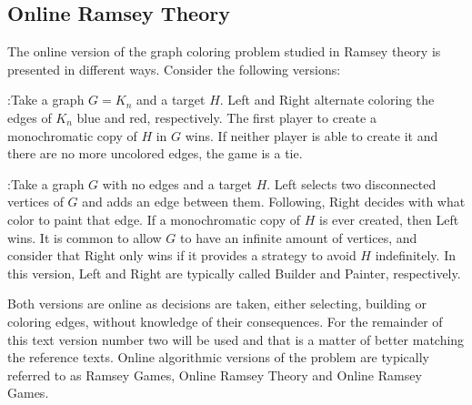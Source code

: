 \subsection*{Online Ramsey Theory}

The online version of the graph coloring problem studied in Ramsey theory is presented in different ways. Consider the following versions:

\begin{version}{1}
:Take a graph $G = K_n$ and a target $H$. Left and Right alternate coloring the edges of $K_n$ blue and red, respectively. The first player to create a monochromatic copy of $H$ in $G$ wins. If neither player is able to create it and there are no more uncolored edges, the game is a tie.
\end{version}

\begin{version}{2}
:Take a graph $G$ with no edges and a target $H$. Left selects two disconnected vertices of $G$ and adds an edge between them. Following, Right decides with what color to paint that edge. If a monochromatic copy of $H$ is ever created, then Left wins. It is common to allow $G$ to have an infinite amount of vertices, and consider that Right only wins if it provides a strategy to avoid $H$ indefinitely. In this version, Left and Right are typically called Builder and Painter, respectively.
\end{version}

Both versions are online as decisions are taken, either selecting, building or coloring edges, without knowledge of their consequences. For the remainder of this text version number two will be used and that is a matter of better matching the reference texts. Online algorithmic versions of the problem are typically referred to as Ramsey Games, Online Ramsey Theory and Online Ramsey Games.

